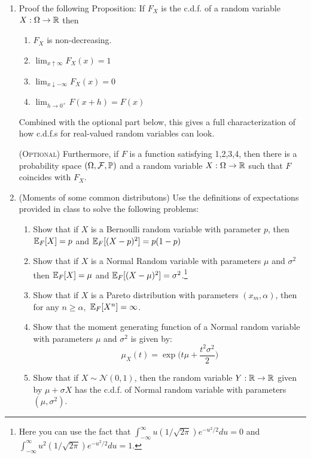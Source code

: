 \documentclass[11pt]{article} %
\begin{document}
\begin{enumerate}
\item Proof the following Proposition: If $F_{X}$ is the c.d.f. of a random variable $X: \Omega \rightarrow \mathbb{R}$ then 
\begin{enumerate}
\item $F_{X}$ is non-decreasing.
\item $\lim_{x \uparrow \infty} F_{X}(x)=1$
\item $\lim_{x \downarrow -\infty} F_{X}(x)=0$
\item $\lim_{h \rightarrow 0^{+}} F(x+h)=F(x)$
\end{enumerate}

 Combined with the optional part below, this gives a full characterization of how c.d.f.s for real-valued random variables can look.

\noindent ({\scshape Optional}) Furthermore, if $F$ is a function satisfying 1,2,3,4, then there is a probability space $(\Omega, \mathcal{F}, \mathbb{P})$ and a random variable $X: \Omega \rightarrow \mathbb{R}$ such that $F$ coincides with $F_{X}$. 

\item (Moments of some common distributons) Use the definitions of expectations provided in class to solve the following problems:
\begin{enumerate}
\item Show that if $X$ is a Bernoulli random variable with parameter $p$, then $\mathbb{E}_{F}[X]=p$ and $\mathbb{E}_{F}[(X-p)^2]=p(1-p)$
\item Show that if $X$ is a Normal Random variable with parameters $\mu$ and $\sigma^2$ then $\mathbb{E}_{F}[X]=\mu$ and $\mathbb{E}_{F}[(X-\mu)^2]=\sigma^2$.\footnote{Here you can use the fact that $\int_{-\infty}^{\infty} u (1/\sqrt{2 \pi}) e^{-u^2/2} du =0$ and $\int_{-\infty}^{\infty} u^2 (1/\sqrt{2 \pi}) e^{-u^2/2} du =1$.} 
\item Show that if $X$ is a Pareto distribution with parameters $(x_m, \alpha)$, then for any $n \geq \alpha,$ $\mathbb{E}_{F}[X^{n}]=\infty$. 
\item Show that the moment generating function of a Normal random variable with parameters $\mu$ and $\sigma^2$ is given by:
$$\mu_{X}(t)= \exp \Big( t \mu + \frac{t^2 \sigma^2}{2}  \Big)  $$

\item Show that if $X \sim \mathcal{N}(0,1)$, then the random variable $Y:\mathbb{R} \rightarrow \mathbb{R}$ given by $\mu + \sigma X$ has the c.d.f. of Normal random variable with parameters $(\mu, \sigma^2)$. 


\end{enumerate}
\end{enumerate}
\end{document}
